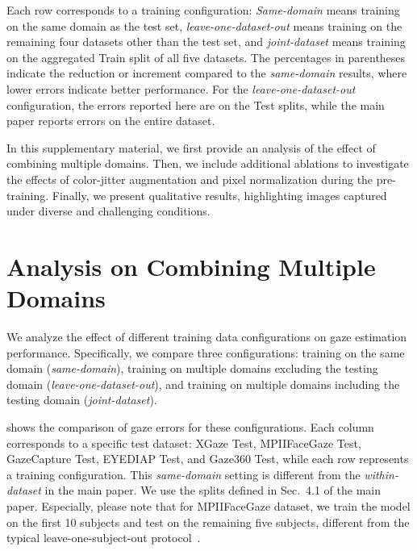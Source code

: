 \begin{table*}[t]
{        Each row corresponds to a training configuration:
        \textit{Same-domain} means training on the same domain as the test set,
        \textit{leave-one-dataset-out} means training on the remaining four datasets other than the test set, and \textit{joint-dataset} means training on the aggregated Train split of all five datasets.
        The percentages in parentheses indicate the reduction or increment compared to the \textit{same-domain} results, where lower errors indicate better performance.
        For the \textit{leave-one-dataset-out} configuration, the errors reported here are on the Test splits, while the main paper reports errors on the entire dataset.
    }
\label{table:comprehensive}
\end{table*}



\noindent In this supplementary material, we first provide an analysis of the effect of combining multiple domains.
Then, we include additional ablations to investigate the effects of color-jitter augmentation and pixel normalization during the pre-training.
Finally, we present qualitative results, highlighting images captured under diverse and challenging conditions.



\section{Analysis on Combining Multiple Domains}\label{sec:supp_data}

We analyze the effect of different training data configurations on gaze estimation performance.
Specifically, we compare three configurations: training on the same domain (\textit{same-domain}), training on multiple domains excluding the testing domain (\textit{leave-one-dataset-out}), and training on multiple domains including the testing domain (\textit{joint-dataset}).

 shows the comparison of gaze errors for these configurations.
Each column corresponds to a specific test dataset: XGaze Test, MPIIFaceGaze Test, GazeCapture Test, EYEDIAP Test, and Gaze360 Test, while each row represents a training configuration.
This \textit{same-domain} setting is different from the \textit{within-dataset} in the main paper. 
We use the splits defined in Sec.~4.1 of the main paper.
Especially, please note that for MPIIFaceGaze dataset, we train the model on the first 10 subjects and test on the remaining five subjects, different from the typical leave-one-subject-out protocol~\cite{abdelrahman2023l2cs,shi2024agent,ververas20253dgazenet}.

